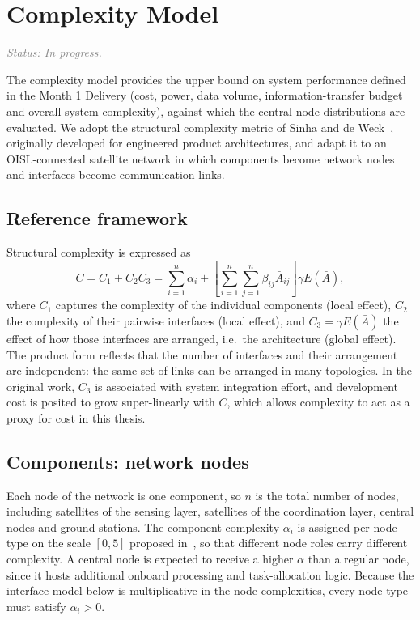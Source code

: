 \documentclass[11pt]{article}
\newcommand{\status}[1]{\textit{\textcolor{gray}{Status: #1}}}
\begin{document}
\section{Complexity Model}\label{sec:complexity}

\status{In progress.}

The complexity model provides the upper bound on system performance defined in the Month 1 Delivery (cost, power, data volume, information-transfer budget and overall system complexity), against which the central-node distributions are evaluated. We adopt the structural complexity metric of Sinha and de Weck~\cite{sinha2013, sinha2012}, originally developed for engineered product architectures, and adapt it to an OISL-connected satellite network in which components become network nodes and interfaces become communication links.

\subsection{Reference framework}\label{subsec:complexity-framework}

Structural complexity is expressed as
\begin{equation}
    C = C_1 + C_2 C_3 = \sum_{i=1}^{n} \alpha_i + \left[ \sum_{i=1}^{n}\sum_{j=1}^{n} \beta_{ij} \bar{A}_{ij} \right] \gamma E(\bar{A}),
    \label{eq:complexity}
\end{equation}
where $C_1$ captures the complexity of the individual components (local effect), $C_2$ the complexity of their pairwise interfaces (local effect), and $C_3 = \gamma E(\bar{A})$ the effect of how those interfaces are arranged, i.e.\ the architecture (global effect). The product form reflects that the number of interfaces and their arrangement are independent: the same set of links can be arranged in many topologies. In the original work, $C_3$ is associated with system integration effort, and development cost is posited to grow super-linearly with $C$, which allows complexity to act as a proxy for cost in this thesis.

\subsection{Components: network nodes}\label{subsec:complexity-nodes}

Each node of the network is one component, so $n$ is the total number of nodes, including satellites of the sensing layer, satellites of the coordination layer, central nodes and ground stations. The component complexity $\alpha_i$ is assigned per node type on the scale $[0,5]$ proposed in~\cite{sinha2013}, so that different node roles carry different complexity. A central node is expected to receive a higher $\alpha$ than a regular node, since it hosts additional onboard processing and task-allocation logic. Because the interface model below is multiplicative in the node complexities, every node type must satisfy $\alpha_i > 0$.
\end{document}

